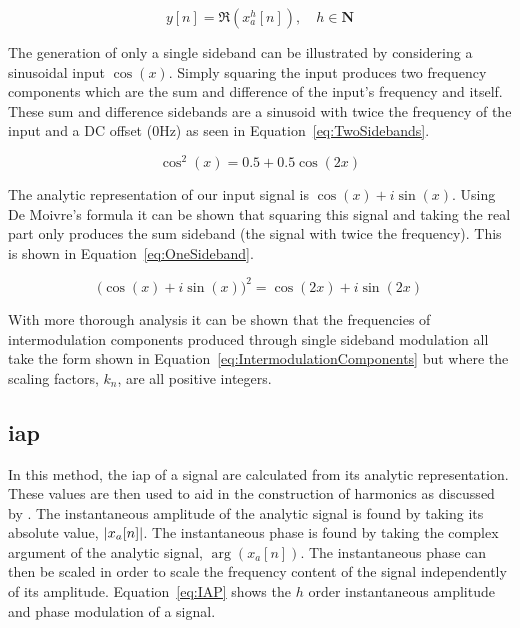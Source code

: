 		\begin{equation}
			y[n] = \Re \left( x_{a}^{h}[n] \right), \quad h \in \textbf{N}
			\label{eq:SSB}
		\end{equation}

		The generation of only a single sideband can be illustrated by considering a sinusoidal input $\cos(x)$.
		Simply squaring the input produces two frequency components which are the sum and difference of the input's
		frequency and itself. These sum and difference sidebands are a sinusoid with twice the frequency of the
		input and a DC offset (0Hz) as seen in Equation~\ref{eq:TwoSidebands}.

		\begin{equation}
			\cos^{2}(x) = 0.5 + 0.5 \cos(2x)
			\label{eq:TwoSidebands}
		\end{equation}

		The analytic representation of our input signal is $\cos(x) + i\sin(x)$. Using De Moivre's formula it can
		be shown that squaring this signal and taking the real part only produces the sum sideband (the signal with
		twice the frequency). This is shown in Equation~\ref{eq:OneSideband}.

		\begin{equation}
			\bigl( \cos(x) + i\sin(x) \bigr)^{2} = \cos(2x) + i\sin(2x)
			\label{eq:OneSideband}
		\end{equation}

		With more thorough analysis it can be shown that the frequencies of intermodulation components produced
		through single sideband modulation all take the form shown in Equation~\ref{eq:IntermodulationComponents}
		but where the scaling factors, $k_{n}$, are all positive integers.

	\subsection{\acrlong{iap}}
	\label{sec:Excitation-Methods-IAP}
		In this method, the \acrfull{iap} of a signal are calculated from its analytic representation. These values
		are then used to aid in the construction of harmonics as discussed by \citet{puckette2007patch}. The
		instantaneous amplitude of the analytic signal is found by taking its absolute value, $\left|x_{a}[n]\right|$. The
		instantaneous phase is found by taking the complex argument of the analytic signal, $\arg(x_{a}[n])$. The
		instantaneous phase can then be scaled in order to scale the frequency content of the signal independently
		of its amplitude.  Equation~\ref{eq:IAP} shows the $h$ order instantaneous amplitude and phase
		modulation of a signal.

